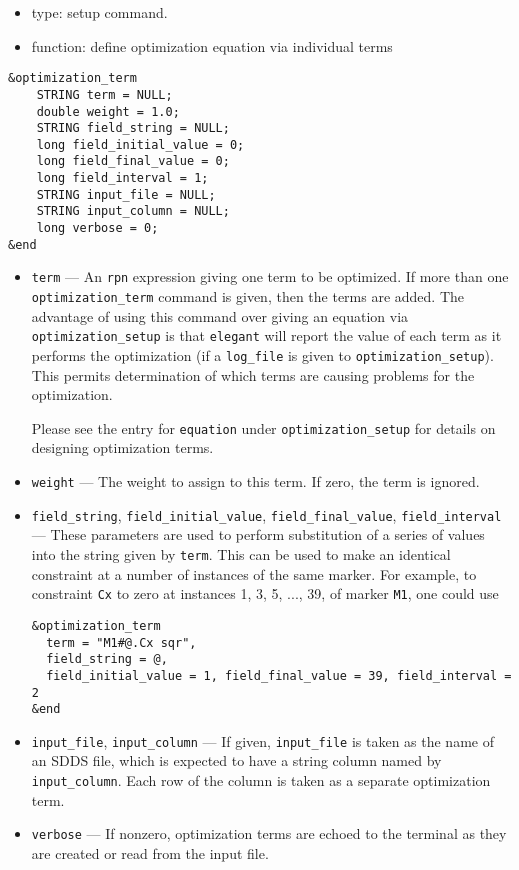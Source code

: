 \documentclass[11pt]{article}
\begin{document}
\begin{itemize}
\item type: setup command.

\item function: define optimization equation via individual terms

\end{itemize}

\begin{verbatim}
&optimization_term
    STRING term = NULL;
    double weight = 1.0;
    STRING field_string = NULL;
    long field_initial_value = 0;
    long field_final_value = 0;
    long field_interval = 1;
    STRING input_file = NULL;
    STRING input_column = NULL;
    long verbose = 0;
&end
\end{verbatim}

\begin{itemize}
\item \verb|term| --- An {\tt rpn} expression giving one term to be optimized.
If more than one \verb|optimization_term| command is given, then the terms are
added.   The advantage of using this command over giving an equation via
\verb|optimization_setup| is that {\tt elegant} will report the value of
each term as it performs the optimization (if a \verb|log_file| is given to
\verb|optimization_setup|).  This permits determination of
which terms are causing problems for the optimization.

Please see the entry for {\tt equation} under {\tt optimization\_setup} for
details on designing optimization terms.

\item \verb|weight| --- The weight to assign to this term.  If zero, the term
        is ignored.


\item \verb|field_string|, \verb|field_initial_value|, \verb|field_final_value|, \verb|field_interval| --- 
  These parameters are used to perform substitution of a series of values into the string given by
  \verb|term|.  This can be used to make an identical constraint at a number of instances
  of the same marker.  For example, to constraint \verb|Cx| to zero at instances 1, 3, 5, ..., 39,
  of marker \verb|M1|, one could use
\begin{verbatim}
&optimization_term
  term = "M1#@.Cx sqr", 
  field_string = @, 
  field_initial_value = 1, field_final_value = 39, field_interval = 2
&end
\end{verbatim}

\item \verb|input_file|, \verb|input_column| --- If given, \verb|input_file| is taken as the name of an SDDS file,
  which is expected to have a string column named by \verb|input_column|.  Each row of the column is taken as
  a separate optimization term.

\item \verb|verbose| --- If nonzero, optimization terms are echoed to the terminal as they are created or read
  from the input file.

\end{itemize}
\end{document}
